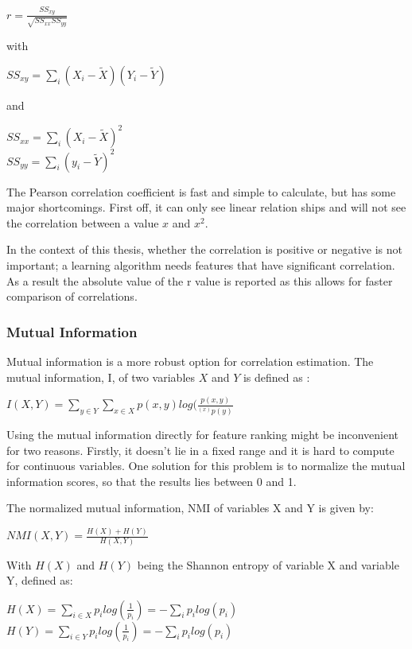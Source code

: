 \begin{center}
$r = \frac{SS_{xy}}{\sqrt{SS_{xx}SS_{yy}}}$
\end{center}
with
\begin{center}
$SS_{xy} = \sum\limits_i (X_i-\tilde{X})(Y_i-\tilde{Y})$
\end{center}
and
\begin{center}
$SS_{xx} = \sum\limits_i (X_i-\tilde{X})^2$ \\
$SS_{yy} = \sum\limits_i (y_i-\tilde{Y})^2$
\end{center}

\npar

The Pearson correlation coefficient is fast and simple to calculate, but has some major shortcomings. First off, it can only see linear relation ships and will not see the correlation between a value $x$ and $x^2$.

\npar

In the context of this thesis, whether the correlation is positive or negative is not important; a learning algorithm needs features that have significant correlation. As a result the absolute value of the r value is reported as this allows for faster comparison of correlations.

\subsubsection{Mutual Information}
Mutual information is a more robust option for correlation estimation. The mutual information, I, of two variables $X$ and $Y$ is defined as \citep{mutPaper}:
\begin{center}
$I(X,Y) = \sum\limits_{y\in Y} \sum\limits_{x\in X} p(x,y)log(\frac{p(x,y)}{^(x)p(y)}$
\end{center}

\npar

Using the mutual information directly for feature ranking might be inconvenient for two reasons. Firstly, it doesn't lie in a fixed range and it is hard to compute for continuous variables. One solution for this problem is to normalize the mutual information scores, so that the results lies between 0 and 1.

The normalized mutual information, NMI of variables X and Y is given by:
\begin{center}
$NMI(X,Y) = \frac{H(X) + H(Y)}{H(X,Y)}$
\end{center}
With $H(X)$ and $H(Y)$ being the Shannon entropy of variable X and variable Y, defined as:
\begin{center}
$H(X) = \sum\limits_{i\in X} p_ilog(\frac{1}{p_i}) = - \sum\limits_i p_ilog(p_i)$\\
$H(Y) = \sum\limits_{i\in Y} p_ilog(\frac{1}{p_i}) = - \sum\limits_i p_ilog(p_i)$
\end{center}
\npar

